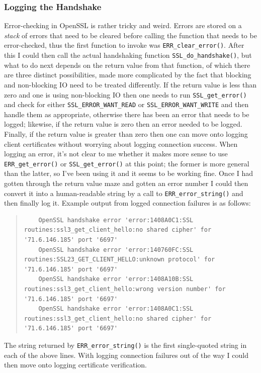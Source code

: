 \documentclass{article}
\begin{document}
\subsubsection{Logging the Handshake}
Error-checking in OpenSSL is rather tricky and weird.  Errors are stored on a \emph{stack} of errors that need to be cleared before calling the function that needs to be error-checked, thus the first function to invoke was \texttt{ERR_clear_error()}.  After this I could then call the actual handshaking function \texttt{SSL_do_handshake()}, but what to do next depends on the return value from that function, of which there are three distinct possibilities, made more complicated by the fact that blocking and non-blocking IO need to be treated differently.  If the return value is less than zero and one is using non-blocking IO then one needs to run \texttt{SSL_get_error()} and check for either \texttt{SSL_ERROR_WANT_READ} or \texttt{SSL_ERROR_WANT_WRITE} and then handle them as appropriate, otherwise there has been an error that needs to be logged; likewise, if the return value is zero then an error needed to be logged.  Finally, if the return value is greater than zero then one can move onto logging client certificates without worrying about logging connection success.  When logging an error, it's not clear to me whether it makes more sense to use \texttt{ERR_get_error()} or \texttt{SSL_get_error()} at this point; the former is more general than the latter, so I've been using it and it seems to be working fine.  Once I had gotten through the return value maze and gotten an error number I could then convert it into a human-readable string by a call to \texttt{ERR_error_string()} and then finally log it.  Example output from logged connection failures is as follows:

\begin{quote}
\begin{verbatim}
	OpenSSL handshake error 'error:1408A0C1:SSL routines:ssl3_get_client_hello:no shared cipher' for '71.6.146.185' port '6697'
	OpenSSL handshake error 'error:140760FC:SSL routines:SSL23_GET_CLIENT_HELLO:unknown protocol' for '71.6.146.185' port '6697'
	OpenSSL handshake error 'error:1408A10B:SSL routines:ssl3_get_client_hello:wrong version number' for '71.6.146.185' port '6697'
	OpenSSL handshake error 'error:1408A0C1:SSL routines:ssl3_get_client_hello:no shared cipher' for '71.6.146.185' port '6697'
\end{verbatim}
\end{quote}

The string returned by \texttt{ERR_error_string()} is the first single-quoted string in each of the above lines.  With logging connection failures out of the way I could then move onto logging certificate verification.
\end{document}
